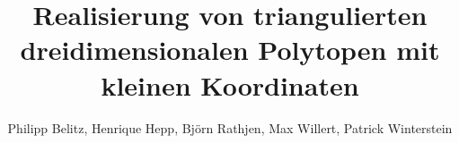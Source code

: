 \documentclass{style}
\begin{document}
	\title{Realisierung von triangulierten dreidimensionalen Polytopen mit kleinen Koordinaten}
	\author{Philipp Belitz, Henrique Hepp, Björn Rathjen, Max Willert, Patrick Winterstein}

	\maketitle
	\setcounter{page}{2}
	
	\newpage
	\onehalfspacing
	
\end{document}
